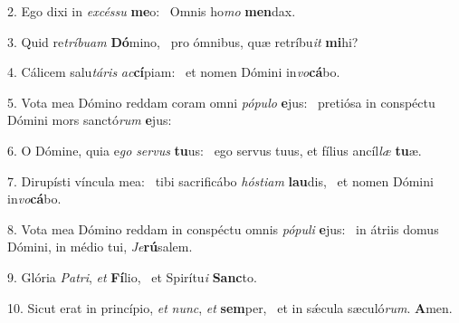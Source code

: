 2. Ego dixi in \textit{ex}\textit{cés}\textit{su} \textbf{me}o: \ast\  Omnis ho\textit{mo} \textbf{men}dax.\

3. Quid re\textit{trí}\textit{bu}\textit{am} \textbf{Dó}mino, \ast\  pro ómnibus, quæ retríbu\textit{it} \textbf{mi}hi?\

4. Cálicem salu\textit{tá}\textit{ris} \textit{ac}\textbf{cí}piam: \ast\  et nomen Dómini in\textit{vo}\textbf{cá}bo.\

5. Vota mea Dómino reddam coram omni \textit{pó}\textit{pu}\textit{lo} \textbf{e}jus: \ast\  pretiósa in conspéctu Dómini mors sanctó\textit{rum} \textbf{e}jus:\

6. O Dómine, quia e\textit{go} \textit{ser}\textit{vus} \textbf{tu}us: \ast\  ego servus tuus, et fílius ancíl\textit{læ} \textbf{tu}æ.\

7. Dirupísti víncula mea: \dag\  tibi sacrificábo \textit{hós}\textit{ti}\textit{am} \textbf{lau}dis, \ast\  et nomen Dómini in\textit{vo}\textbf{cá}bo.\

8. Vota mea Dómino reddam in conspéctu omnis \textit{pó}\textit{pu}\textit{li} \textbf{e}jus: \ast\  in átriis domus Dómini, in médio tui, \textit{Je}\textbf{rú}salem.\

9. Glória \textit{Pa}\textit{tri}, \textit{et} \textbf{Fí}lio, \ast\  et Spirítu\textit{i} \textbf{Sanc}to.\

10. Sicut erat in princípio, \textit{et} \textit{nunc}, \textit{et} \textbf{sem}per, \ast\  et in sǽcula sæculó\textit{rum}. \textbf{A}men.\

